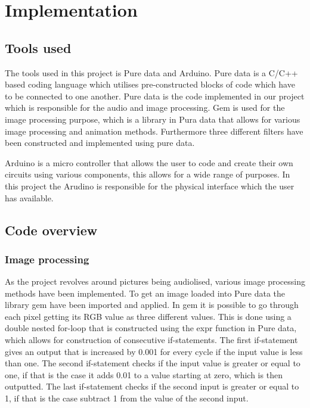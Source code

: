 \chapter{Implementation}\label{ch:implementation}

\section{Tools used}\label{sec:codeoverview}
The tools used in this project is Pure data and Arduino. 
Pure data is a C/C++ based coding language which utilises pre-constructed blocks of code which have to be connected to one another. Pure data is the code implemented in our project which is responsible for the audio and image processing. Gem is used for the image processing purpose, which is a library in Pura data that allows for various image processing and animation methods.  
Furthermore three different filters have been constructed and implemented using pure data.

Arduino is a micro controller that allows the user to code and create their own circuits using various components, this allows for a wide range of purposes. In this project the Arudino is responsible for the physical interface which the user has available. 

\section{Code overview}\label{sec:codeoverview}
	\subsection{Image processing}\label{sub:imageprocessing}
	As the project revolves around pictures being audiolised, various image processing methods have been implemented. To get an image loaded into Pure data the library gem have been imported and applied. In gem it is possible to go through each pixel getting its RGB value as three different values. This is done using a double nested for-loop that is constructed using the expr function in Pure data, which allows for construction of consecutive if-statements. The first if-statement gives an output that is increased by 0.001 for every cycle if the input value is less than one. The second if-statement checks if the input value is greater or equal to one, if that is the case it adds 0.01 to a value starting at zero, which is then outputted. The last if-statement checks if the second input is greater or equal to 1, if that is the case subtract 1 from the value of the second input.
	
